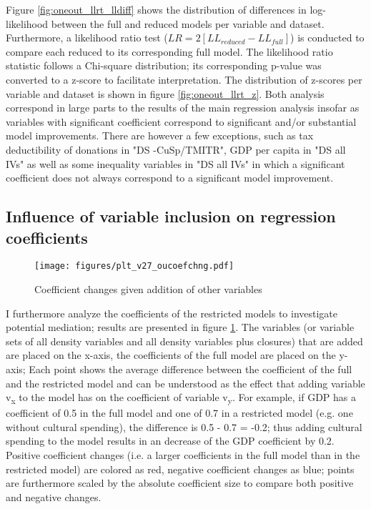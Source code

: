 \documentclass[11pt]{article}
\begin{document}
Figure \ref{fig:oneout_llrt_lldiff} shows the distribution of differences in log-likelihood between the full and reduced models per variable and dataset.
Furthermore, a likelihood ratio test (\(LR = 2[LL_{reduced} - LL_{full}]\)) is conducted to compare each reduced to its corresponding full model.
The likelihood ratio statistic follows a Chi-square distribution; its corresponding p-value was converted to a z-score to facilitate interpretation.
The distribution of z-scores per variable and dataset is shown in figure \ref{fig:oneout_llrt_z}.
Both analysis correspond in large parts to the results of the main regression analysis insofar as variables with significant coefficient correspond to significant and/or substantial model improvements.
There are however a few exceptions, such as tax deductibility of donations in "DS -CuSp/TMITR", GDP per capita in "DS all IVs" as well as some inequality variables in "DS all IVs" in which a significant coefficient does not always correspond to a significant model improvement. 



\subsection{Influence of variable inclusion on regression coefficients}
\label{app_mediation}
\begin{landscape}

\begin{figure}[htbp]
\centering
\texttt{[image: figures/plt\_v27\_oucoefchng.pdf]}
\caption{\label{fig:oucoefchng}Coefficient changes given addition of other variables}
\end{figure}

\end{landscape}

I furthermore analyze the coefficients of the restricted models to investigate potential mediation; results are presented in figure \ref{fig:oucoefchng}.
The variables (or variable sets of all density variables and all density variables plus closures) that are added are placed on the x-axis, the coefficients of the full model are placed on the y-axis;
Each point shows the average difference between the coefficient of the full and the restricted model and can be understood as the effect that adding variable v\textsubscript{x} to the model has on the coefficient of variable v\textsubscript{y}.
For example, if GDP has a coefficient of 0.5 in the full model and one of 0.7 in a restricted model (e.g. one without cultural spending), the difference is 0.5 - 0.7 = -0.2; thus adding cultural spending to the model results in an decrease of the GDP coefficient by 0.2. 
Positive coefficient changes (i.e. a larger coefficients in the full model than in the restricted model) are colored as red, negative coefficient changes as blue; points are furthermore scaled by the absolute coefficient size to compare both positive and negative changes. 
\end{document}
